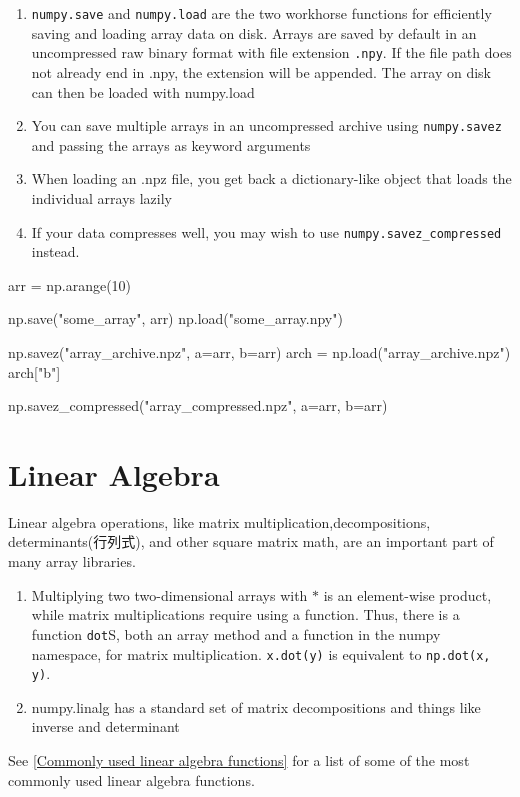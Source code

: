 \begin{enumerate}
    \item \verb|numpy.save| and \verb|numpy.load| are the two workhorse functions for efficiently saving and loading array data on disk. Arrays are saved by default in an uncompressed raw binary format with file extension \verb|.npy|. If the file path does not already end in .npy, the extension will be appended. The array on disk can then be loaded with numpy.load
    \item You can save multiple arrays in an uncompressed archive using \verb|numpy.savez| and passing the arrays as keyword arguments
    \item When loading an .npz file, you get back a dictionary-like object that loads the individual arrays lazily
    \item If your data compresses well, you may wish to use \verb|numpy.savez_compressed| instead. 
\end{enumerate}

\begin{pyc}
arr = np.arange(10)

np.save("some_array", arr)
np.load("some_array.npy")

np.savez("array_archive.npz", a=arr, b=arr)
arch = np.load("array_archive.npz")
arch["b"]

np.savez_compressed("array_compressed.npz", a=arr, b=arr)
\end{pyc}
\section{Linear Algebra}
Linear algebra operations, like matrix multiplication,decompositions, determinants(行列式), and other square matrix math, are an important part of many array libraries.
\begin{enumerate}
    \item Multiplying two two-dimensional arrays with $*$ is an element-wise product, while matrix multiplications require using a function. Thus, there is a function \verb|dot|S, both an array method and a function in the numpy namespace, for matrix multiplication. \verb|x.dot(y)| is equivalent to \verb|np.dot(x, y)|.
    \item numpy.linalg has a standard set of matrix decompositions and things like inverse and determinant
\end{enumerate}

See \autoref{Commonly used linear algebra functions} for a list of some of the most commonly used linear algebra functions.

